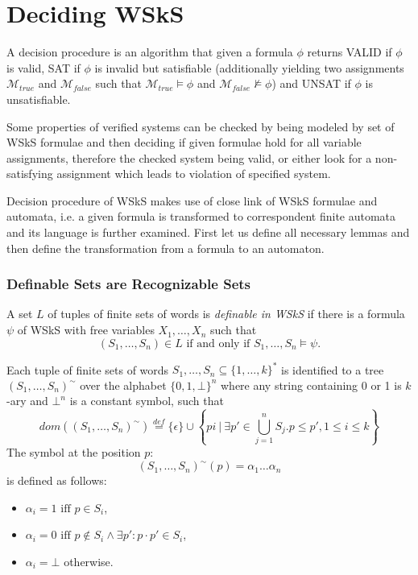 \section{Deciding WSkS}\label{classical}

A decision procedure is an algorithm that given a formula $\phi$ returns VALID if $\phi$ is valid, SAT if $\phi$ is invalid but satisfiable (additionally yielding two assignments $\mathcal{M}_{true}$ and $\mathcal{M}_{false}$ such that $\mathcal{M}_{true} \vDash \phi$ and $\mathcal{M}_{false} \not\vDash \phi$) and UNSAT if $\phi$ is unsatisfiable.

Some properties of verified systems can be checked by being modeled by set of WSkS formulae and then deciding if given formulae hold for all variable assignments, therefore the checked system being valid, or either look for a non-satisfying assignment which leads to violation of specified system.

Decision procedure of WSkS makes use of close link of WSkS formulae and automata, i.e. a given formula is transformed to correspondent finite automata and its language is further examined. First let us define all necessary lemmas and then define the transformation from a formula to an automaton.

 \subsubsection{Definable Sets are Recognizable Sets}
\begin{defz}
 A set $L$ of tuples of finite sets of words is \emph{definable in WSkS} if there is a formula $\psi$ of WSkS with free variables $X_1,\ldots,X_n$ such that $$(S_1,\ldots,S_n) \in L \text{ if and only if } S_1,\ldots,S_n \vDash \psi.$$
\end{defz}

Each tuple of finite sets of words $S_1,\ldots,S_n \subseteq \{1,\ldots,k\}^*$ is identified to a tree $(S_1,\ldots,S_n)^\sim$ over the alphabet $\{0,1,\bot\}^n$ where any string containing 0 or 1 is $k$-ary and $\bot^n$ is a constant symbol, such that
 \begin{equation}
  dom((S_1,\ldots,S_n)^\sim) \overset{def}{=} \{\epsilon\} \cup \left\{ pi\ |\ \exists p' \in \bigcup_{j = 1}^n S_j.p \leq p', 1 \leq i \leq k\right\}
 \end{equation}
The symbol at the position $p$: $$(S_1,\ldots,S_n)^\sim(p) = \alpha_1\ldots\alpha_n$$ is defined as follows:
 \begin{itemize}
  \item $\alpha_i = 1 \text{ iff } p \in S_i$,
  \item $\alpha_i = 0 \text{ iff } p \notin S_i \wedge \exists p': p\cdot p' \in S_i$,
  \item $\alpha_i = \bot$ otherwise.
 \end{itemize}
 
